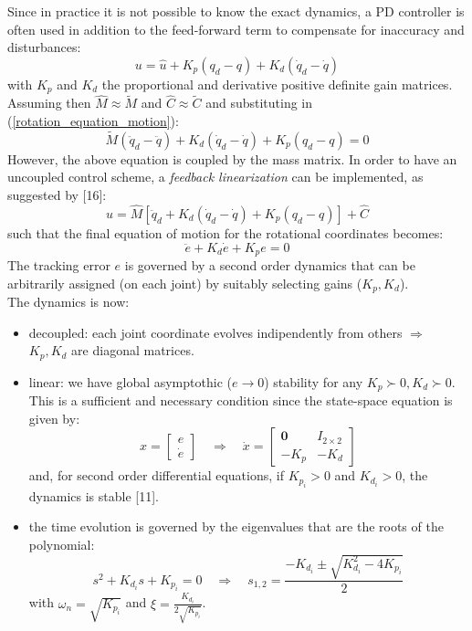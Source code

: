 \documentclass[a4paper,12pt,oneside]{report}
\begin{document}
Since in practice it is not possible to know the exact dynamics, a PD controller is often used in addition to the feed-forward term to compensate for inaccuracy and disturbances:
\begin{equation}
  u=\hat{u}+K_p(q_d-q)+K_d(\dot{q}_d-\dot{q})
\end{equation}
with $K_p$ and $K_d$ the proportional and derivative positive definite gain matrices.\\
Assuming then $\hat{M}\approx\tilde{M}$ and $\hat{C}\approx\tilde{C}$ and substituting in (\ref{rotation_equation_motion}):
\begin{equation}
  \tilde{M}(\ddot{q}_d-\ddot{q})+K_d(\dot{q}_d-\dot{q})+K_p(q_d-q)=0
\end{equation}
However, the above equation is coupled by the mass matrix. In order to have an uncoupled control scheme, a \textit{feedback linearization} can be implemented, as suggested by [16]:
\begin{equation}
  u=\hat{M}[\ddot{q}_d+K_d(\dot{q}_d-\dot{q})+K_p(q_d-q)]+\hat{C}
  \label{feedback_linearization}
\end{equation}
such that the final equation of motion for the rotational coordinates becomes:
\begin{equation}
  \ddot{e}+K_d\dot{e}+K_pe=0
  \label{controlled_dynamics}
\end{equation}
The tracking error $e$ is governed by a second order dynamics that can be arbitrarily assigned (on each joint) by suitably selecting gains ($K_p,K_d$).\\
The dynamics is now:
\begin{itemize}
  \item decoupled: each joint coordinate evolves indipendently from others $\Rightarrow$ $K_p,K_d$ are diagonal matrices.
  \item linear: we have global asymptothic ($e\rightarrow 0$) stability for any $K_p\succ 0,K_d\succ 0$. This is a sufficient and necessary condition since the state-space equation is given by:
    \begin{equation}
      x=\begin{bmatrix}
        e\\\dot{e}
      \end{bmatrix}\quad \Rightarrow \quad \dot{x}=\begin{bmatrix}
        \mathbf{0}&I_{2\times 2}\\
        -K_p&-K_d
      \end{bmatrix}
    \end{equation}
    and, for second order differential equations, if $K_{p_i}>0$ and $K_{d_i}>0$, the dynamics is stable [11].
  \item the time evolution is governed by the eigenvalues that are the roots of the polynomial:
    \begin{equation}
      s^2+K_{d_i}s+K_{p_i}=0 \quad \Rightarrow \quad s_{1,2}=\frac{-K_{d_i}\pm \sqrt{K_{d_i}^2-4K_{p_i}}}{2}
    \end{equation}
    with $\omega_n=\sqrt{K_{p_i}}$ and $\xi=\frac{K_{d_i}}{2\sqrt{K_{p_i}}}$.
\end{itemize}
\end{document}

